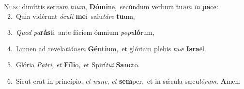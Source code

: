 \lettrine{\initial\textcolor{\initialcolor}{N}}{unc} dimíttis ser\textit{vum} \textit{tu}\-\textit{um}, \textbf{Dó}\-\textbf{mi}ne,~\star secúndum verbum tu\textit{um} \textit{in} \textbf{pa}\-ce:\\
{\numbfont\textcolor{\numbcolor}{~2.}}~Quia vidérunt \textit{ó}\-\textit{cu}\textit{li} \textbf{me}\-i~\star salu\-\textit{tá}\-\textit{re} \textbf{tu}\-um,\par
{\numbfont\textcolor{\numbcolor}{~3.}}~\textit{Quod} \textit{pa}\-\textbf{rás}ti~\star ante fáciem ómnium \textit{po}\-\textit{pu}\textbf{ló}rum,\par
{\numbfont\textcolor{\numbcolor}{~4.}}~Lumen ad revela\-\textit{ti}\-\textit{ó}\textit{nem} \textbf{Gén}\-\textbf{ti}um,~\star et glóriam plebis \textit{tu}\-\textit{æ} \textbf{Is}\-\textbf{ra}ël.\par
{\numbfont\textcolor{\numbcolor}{~5.}}~Glória \textit{Pa}\-\textit{tri}, \textit{et} \textbf{Fí}\-\textbf{li}o,~\star et Spirí\-\textit{tu}\-\textit{i} \textbf{Sanc}\-to.\par
{\numbfont\textcolor{\numbcolor}{~6.}}~Sicut erat in princípio, \textit{et} \textit{nunc}\-, \textit{et} \textbf{sem}\-per,~\star et in sǽcula sæcu\-\textit{ló}\-\textit{rum}. \textbf{A}\-men.\par
